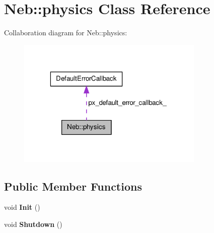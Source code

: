 \hypertarget{classNeb_1_1physics}{\section{\-Neb\-:\-:physics \-Class \-Reference}
\label{classNeb_1_1physics}
}


\-Collaboration diagram for \-Neb\-:\-:physics\-:\nopagebreak
\begin{figure}[H]
\begin{center}
\leavevmode
\includegraphics[width=253pt]{classNeb_1_1physics__coll__graph}
\end{center}
\end{figure}
\subsection*{\-Public \-Member \-Functions}
\begin{DoxyCompactItemize}
\item 
\hypertarget{classNeb_1_1physics_ad38feaab86cbbe5bb07fa0e26f7642e0}{void {\bfseries \-Init} ()}\label{classNeb_1_1physics_ad38feaab86cbbe5bb07fa0e26f7642e0}

\item 
\hypertarget{classNeb_1_1physics_a7ff5f3e6a5d15ae6ac2f19860785e13e}{void {\bfseries \-Shutdown} ()}\label{classNeb_1_1physics_a7ff5f3e6a5d15ae6ac2f19860785e13e}

\end{DoxyCompactItemize}
